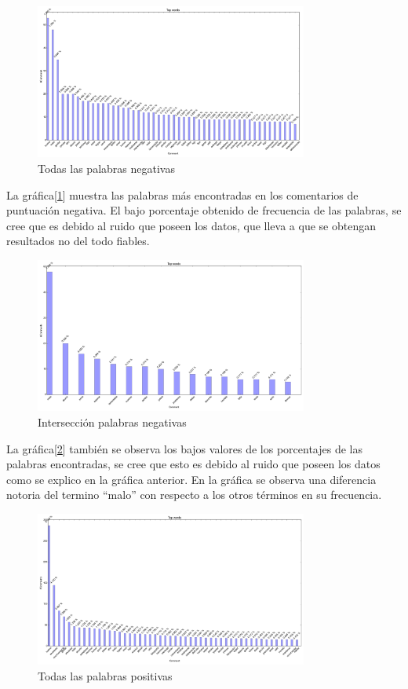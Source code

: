 \documentclass[12pt]{article}
\begin{document}
\begin{figure}[!h]
  \centering
    \includegraphics[width=0.8\textwidth]{./fig/NegativeWords.png}
  \caption{Todas las palabras negativas}
  \label{fig:allneg}
\end{figure} 
La gráfica[\ref{fig:allneg}] muestra las palabras más encontradas en los comentarios de puntuación negativa. El bajo porcentaje obtenido de frecuencia de las palabras, se cree que es debido al ruido que poseen los datos, que lleva a que se obtengan resultados no del todo fiables.


\begin{figure}[!h]
  \centering
    \includegraphics[width=0.8\textwidth]{./fig/NegativeSubjetive.png}
  \caption{Intersección palabras negativas}
  \label{fig:negsub}
\end{figure} 

La gráfica[\ref{fig:negsub}] también se observa los bajos valores de los porcentajes de las palabras encontradas, se cree que esto es debido al ruido que poseen los datos como se explico en la gráfica anterior. En la gráfica se observa una diferencia notoria del termino “malo” con respecto a los otros términos en su frecuencia.


\begin{figure}[!h]
  \centering
    \includegraphics[width=0.8\textwidth]{./fig/PositiveWords.png}
  \caption{Todas las palabras positivas}
  \label{fig:pos}
\end{figure} 
\end{document}
